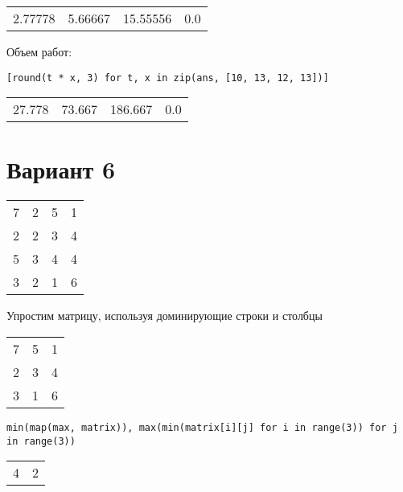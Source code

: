 \documentclass[11pt]{article}
\begin{document}
\begin{center}
\begin{tabular}{rrrr}
2.77778 & 5.66667 & 15.55556 & 0.0\\[0pt]
\end{tabular}
\end{center}

Объем работ:

\begin{verbatim}
[round(t * x, 3) for t, x in zip(ans, [10, 13, 12, 13])]
\end{verbatim}

\begin{center}
\begin{tabular}{rrrr}
27.778 & 73.667 & 186.667 & 0.0\\[0pt]
\end{tabular}
\end{center}


\section*{Вариант 6}
\label{sec:org0719cda}

\begin{center}
\begin{tabular}{rrrr}
7 & 2 & 5 & 1\\[0pt]
2 & 2 & 3 & 4\\[0pt]
5 & 3 & 4 & 4\\[0pt]
3 & 2 & 1 & 6\\[0pt]
\end{tabular}
\end{center}

Упростим матрицу, используя доминирующие строки и столбцы

\begin{table}[htbp]
\label{matrix6}
\centering
\begin{tabular}{rrr}
7 & 5 & 1\\[0pt]
2 & 3 & 4\\[0pt]
3 & 1 & 6\\[0pt]
\end{tabular}
\end{table}

\begin{verbatim}
min(map(max, matrix)), max(min(matrix[i][j] for i in range(3)) for j in range(3))
\end{verbatim}

\begin{center}
\begin{tabular}{rr}
4 & 2\\[0pt]
\end{tabular}
\end{center}
\end{document}
